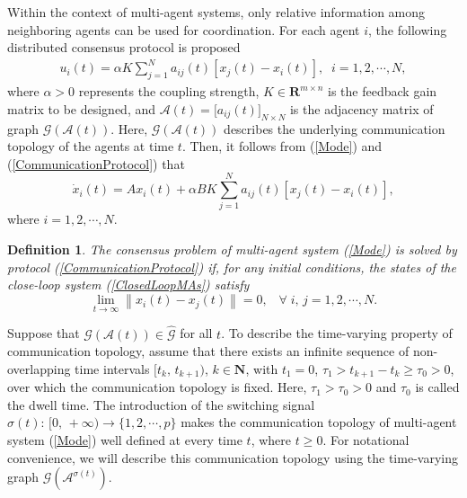 \documentclass[letterpaper, 10 pt, conference]{ieeeconf}
\newtheorem{definition}{Definition}
\begin{document}
Within the context of multi-agent systems, only relative information among neighboring agents can be used for coordination. For each agent $i$, the following distributed consensus protocol is proposed
\begin{eqnarray} \label{CommunicationProtocol}
  u_{i}(t)=\alpha K\sum_{j=1}^{N}\!a_{ij}(t)\!\left[x_{j}(t){-}x_{i}(t)\right],\;\;i=1,2,\cdots,N,
   \end{eqnarray}
where $\alpha>0$ represents the coupling strength, $K \in
\mathbf{R}^{m\times n}$ is the feedback gain matrix to be designed, and $\mathcal{A}(t)=\big[a_{ij}(t)\big]_{N\times N}$ is the
adjacency matrix of graph $\mathcal{G}(\mathcal {A}(t))$. Here,
$\mathcal{G}(\mathcal {A}(t))$ describes the underlying communication
topology of the agents at time $t$. Then, it follows from (\ref{Mode}) and
(\ref{CommunicationProtocol}) that
 \begin{equation}\label{ClosedLoopMAs}
\dot {x}_{i}(t) =Ax_{i}(t)+\alpha BK\sum_{j=1}^{N}{a}_{ij}(t)[x_{j}(t)-x_{i}(t)],
\end{equation}
where $i=1,2,\cdots,N$.
 \par

\begin{definition}\label{ConsensusDefinition}
 The consensus problem of multi-agent system (\ref{Mode}) is solved by
 protocol (\ref{CommunicationProtocol}) if, for any initial conditions, the
 states of the close-loop system (\ref{ClosedLoopMAs}) satisfy
\begin{equation}
{\lim _{t \to \infty }}\left\| {{x _i}(t) - {x _j}(t)} \right\| = 0,\;\;\;\forall \;i,\,j = 1,2, \cdots, N.
\end{equation}
\end{definition}
\par
Suppose that $\mathcal{G}(\mathcal {A}(t))\in \widehat{\mathcal{G}}$ for all $t$. To describe the time-varying property of communication topology, assume that there exists
an infinite sequence of non-overlapping time intervals $[t_{k},\,t_{k+1})$,
$k\in \mathbf{N}$, with $t_{1}=0$, $\tau_{1}>t_{k+1}-t_{k}\geq \tau_{0}>0$,
over which the communication topology is fixed. Here, $\tau_{1}>\tau_{0}>0$
and  $\tau_{0}$ is called the dwell time.
The introduction of the switching signal
$\sigma(t):\,[0,\,+\infty)\rightarrow \{1,2,\cdots,p\}$ makes the
communication topology of multi-agent system (\ref{Mode}) well defined at
every time $t$, where $t\geq 0$. For notational convenience, we will
describe this communication topology using the time-varying graph
$\mathcal{G}(\mathcal{A}^{\sigma(t)})$.
\end{document}
